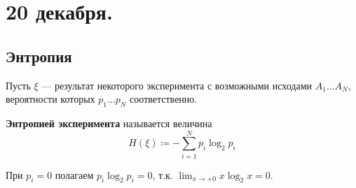 \chapter{20 декабря.}

\section{Энтропия}

Пусть \(\xi\) --- результат некоторого эксперимента с возможными исходами \(A_1 \dots A_N\), вероятности которых \(p_1 \dots p_N\) соответственно.

\begin{definition}
    \textbf{Энтропией эксперимента} называется величина
    \[H(\xi) \coloneqq - \sum_{i=1}^{N} p_i \log_2 p_i\]
\end{definition}

\begin{remark}
    При \(p_i = 0\) полагаем \(p_i \log_2 p_i = 0\), т.к. \(\lim_{x \to + 0} x \log_2 x = 0\).
\end{remark}

